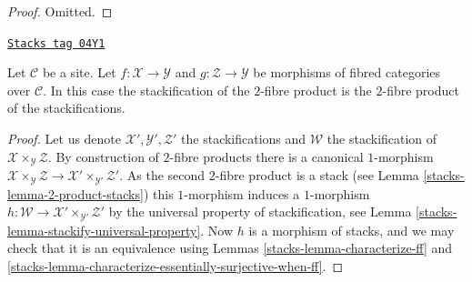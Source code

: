 \begin{proof}
Omitted.
\end{proof}

\begin{lemma}
\label{stacks-lemma-stackification-fibre-product-fibred-categories}
\href{https://stacks.math.columbia.edu/tag/04Y1}{\texttt{Stacks tag 04Y1}}

Let $\mathcal{C}$ be a site.
Let $f : \mathcal{X} \to \mathcal{Y}$ and $g : \mathcal{Z} \to \mathcal{Y}$
be morphisms of fibred categories over $\mathcal{C}$.
In this case the stackification of the $2$-fibre product is the $2$-fibre
product of the stackifications.
\end{lemma}

\begin{proof}

Let us denote $\mathcal{X}', \mathcal{Y}', \mathcal{Z}'$ the stackifications
and $\mathcal{W}$ the stackification of
$\mathcal{X} \times_\mathcal{Y} \mathcal{Z}$. By construction of $2$-fibre
products there is a canonical $1$-morphism
$\mathcal{X} \times_\mathcal{Y} \mathcal{Z} \to
\mathcal{X}' \times_{\mathcal{Y}'} \mathcal{Z}'$.
As the second $2$-fibre product is a stack (see
Lemma \ref{stacks-lemma-2-product-stacks})
this $1$-morphism induces a $1$-morphism
$h : \mathcal{W} \to \mathcal{X}' \times_{\mathcal{Y}'} \mathcal{Z}'$
by the universal property of stackification, see
Lemma \ref{stacks-lemma-stackify-universal-property}.
Now $h$ is a morphism of stacks, and we may check that it is an
equivalence using
Lemmas \ref{stacks-lemma-characterize-ff} and
\ref{stacks-lemma-characterize-essentially-surjective-when-ff}.


\end{proof}

